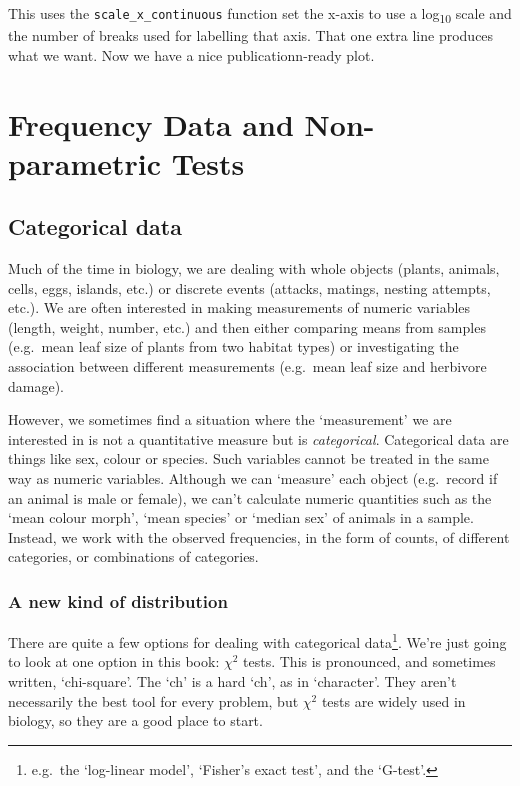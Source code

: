 \documentclass[
]{book}
\begin{document}
This uses the \texttt{scale\_x\_continuous} function set the x-axis to use a log\textsubscript{10} scale and the number of breaks used for labelling that axis. That one extra line produces what we want. Now we have a nice publicationn-ready plot.

\hypertarget{part-frequency-data-and-non-parametric-tests}{%
\part{Frequency Data and Non-parametric Tests}\label{part-frequency-data-and-non-parametric-tests}}

\hypertarget{categorical-data-intro-chapter}{%
\chapter{Categorical data}\label{categorical-data-intro-chapter}}

Much of the time in biology, we are dealing with whole objects (plants, animals, cells, eggs, islands, etc.) or discrete events (attacks, matings, nesting attempts, etc.). We are often interested in making measurements of numeric variables (length, weight, number, etc.) and then either comparing means from samples (e.g.~mean leaf size of plants from two habitat types) or investigating the association between different measurements (e.g.~mean leaf size and herbivore damage).

However, we sometimes find a situation where the `measurement' we are interested in is not a quantitative measure but is \emph{categorical}. Categorical data are things like sex, colour or species. Such variables cannot be treated in the same way as numeric variables. Although we can `measure' each object (e.g.~record if an animal is male or female), we can't calculate numeric quantities such as the `mean colour morph', `mean species' or `median sex' of animals in a sample. Instead, we work with the observed frequencies, in the form of counts, of different categories, or combinations of categories.

\hypertarget{a-new-kind-of-distribution}{%
\section{A new kind of distribution}\label{a-new-kind-of-distribution}}

There are quite a few options for dealing with categorical data\footnote{e.g.~the `log-linear model', `Fisher's exact test', and the `G-test'.}. We're just going to look at one option in this book: \(\chi^2\) tests. This is pronounced, and sometimes written, `chi-square'. The `ch' is a hard `ch', as in `character'. They aren't necessarily the best tool for every problem, but \(\chi^2\) tests are widely used in biology, so they are a good place to start.
\end{document}
